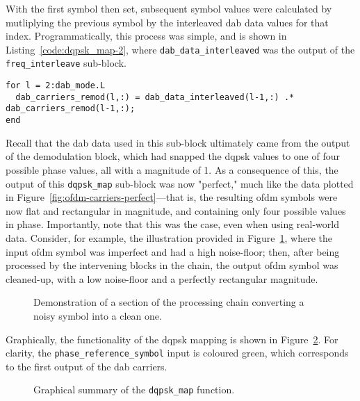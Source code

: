 \documentclass[class=report,11pt,crop=false]{standalone}
\begin{document}
With the first symbol then set, subsequent symbol values were calculated by mutliplying the previous symbol by the interleaved \gls{dab} data values for that index. Programmatically, this process was simple, and is shown in Listing~\ref{code:dqpsk_map-2}, where \texttt{dab\_data\_interleaved} was the output of the \texttt{freq\_interleave} sub-block.

\begin{lstlisting}[caption={\textsc{Matlab} code for the actual \texttt{dqpsk\_map} functionality of differential modulation.},label={code:dqpsk_map-2}]
for l = 2:dab_mode.L
  dab_carriers_remod(l,:) = dab_data_interleaved(l-1,:) .* dab_carriers_remod(l-1,:);
end
\end{lstlisting}

Recall that the \gls{dab} data used in this sub-block ultimately came from the output of the demodulation block, which had snapped the \gls{dqpsk} values to one of four possible phase values, all with a magnitude of 1. As a consequence of this, the output of this \texttt{dqpsk\_map} sub-block was now "perfect," much like the data plotted in Figure~\ref{fig:ofdm-carriers-perfect}---that is, the resulting \gls{ofdm} symbols were now flat and rectangular in magnitude, and containing only four possible values in phase. Importantly, note that this was the case, even when using real-world data. Consider, for example, the illustration provided in Figure~\ref{fig:dqpsk_map-demo}, where the input \gls{ofdm} symbol was imperfect and had a high noise-floor; then, after being processed by the intervening blocks in the chain, the output \gls{ofdm} symbol was cleaned-up, with a low noise-floor and a perfectly rectangular magnitude.

\begin{figure}[htbp]
  \centering
  \captionsetup{type=figure}
  \def\svgwidth{\linewidth}
  { %
    }
  \caption{Demonstration of a section of the processing chain converting a noisy  symbol into a clean one.}
  \label{fig:dqpsk_map-demo}
\end{figure}

Graphically, the functionality of the \gls{dqpsk} mapping is shown in Figure~\ref{fig:dqpsk_map}. For clarity, the \texttt{phase\_reference\_symbol} input is coloured green, which corresponds to the first output of the \gls{dab} carriers.

\begin{figure}[htbp]
  \centering
  \captionsetup{type=figure}
  \def\svgwidth{\linewidth}
  { %
  }
  \caption{Graphical summary of the \texttt{dqpsk\_map} function.}
  \label{fig:dqpsk_map}
\end{figure}
\end{document}
